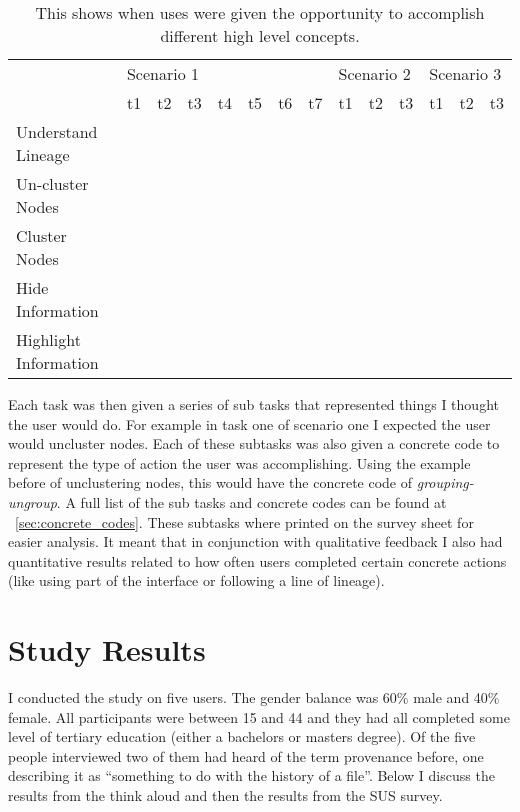 	
\begin{table}[h]
	\centering
	\caption{This shows when uses were given the opportunity to accomplish different high level concepts.}
	\def\arraystretch{1.5}
	\label{tab:conceptual_activities}
	\begin{tabular}{|l|l|l|l|l|l|l|l|l|l|l|l|l|l|}
	\hline
	\multirow{2}{*}{} & \multicolumn{7}{l|}{Scenario 1} & \multicolumn{3}{l|}{Scenario 2} & \multicolumn{3}{l|}{Scenario 3}\\
	\cline{2-14}
	& t1 & t2 & t3 & t4 & t5 & t6 & t7 & t1 & t2 & t3 & t1 & t2 & t3 \\
	\hline
	Understand Lineage & \checkmark & \checkmark & \checkmark & \checkmark & \checkmark & \checkmark& & \checkmark&& & \checkmark&& \\
	\hline
	Un-cluster Nodes & \checkmark & & \checkmark &\checkmark &\checkmark &\checkmark & &&&&&&\\
	\hline
	Cluster Nodes &&&&&&&&&\checkmark &\checkmark &&\checkmark &\checkmark \\
	\hline
	Hide Information &&&&&&&&&\checkmark &\checkmark &&& \\
	\hline
	Highlight Information &&&&&&&&&\checkmark &\checkmark &&\checkmark &\checkmark \\
	\hline
	\end{tabular}
\end{table}

Each task was then given a series of sub tasks that represented things I thought the user would do. For example in task one of scenario one I expected the user would uncluster nodes. Each of these subtasks was also given a concrete code to represent the type of action the user was accomplishing. Using the example before of unclustering nodes, this would have the concrete code of \textit{grouping-ungroup}. A full list of the sub tasks and concrete codes can be found at ~\ref{sec:concrete_codes}. These subtasks where printed on the survey sheet for easier analysis. It meant that in conjunction with qualitative feedback I also had quantitative results related to how often users completed certain concrete actions (like using  part of the interface or following a line of lineage).


\section{Study Results}
\label{sec:study_results}

I conducted the study on five users. The gender balance was 60\% male and 40\% female. All participants were between 15 and 44 and they had all completed some level of tertiary education (either a bachelors or masters degree). Of the five people interviewed two of them had heard of the term provenance before, one describing it as ``something to do with the history of a file''. Below I discuss the results from the think aloud and then the results from the SUS survey.

